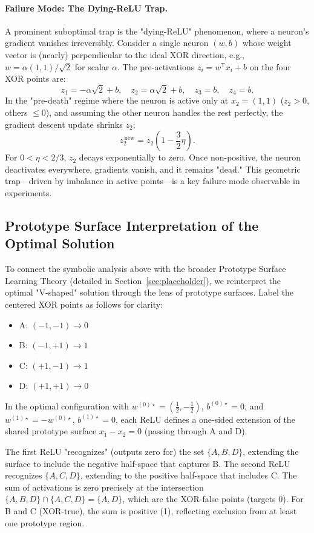 \paragraph{Failure Mode: The Dying-ReLU Trap.}
A prominent suboptimal trap is the "dying-ReLU" phenomenon, where a neuron's gradient vanishes irreversibly. Consider a single neuron \((w,b)\) whose weight vector is (nearly) perpendicular to the ideal XOR direction, e.g., \(w = \alpha (1, 1)/\sqrt{2}\) for scalar \(\alpha\). The pre-activations \(z_i = w^{\mathsf T}x_i + b\) on the four XOR points are:
\[
    z_1 = -\alpha\sqrt{2}+b, \quad z_2=\alpha\sqrt{2}+b, \quad z_3=b, \quad z_4=b.
\]
In the "pre-death" regime where the neuron is active only at \(x_2=(1,1)\) (\(z_2 > 0\), others \(\leq 0\)), and assuming the other neuron handles the rest perfectly, the gradient descent update shrinks \(z_2\):
\[
    z_2^{\,\text{new}} = z_2 \left(1-\frac{3}{2}\eta\right).
\]
For \(0 < \eta < 2/3\), \(z_2\) decays exponentially to zero. Once non-positive, the neuron deactivates everywhere, gradients vanish, and it remains "dead." This geometric trap—driven by imbalance in active points—is a key failure mode observable in experiments.

\subsection*{Prototype Surface Interpretation of the Optimal Solution}

To connect the symbolic analysis above with the broader Prototype Surface Learning Theory (detailed in Section~\ref{sec:placeholder}), we reinterpret the optimal "V-shaped" solution through the lens of prototype surfaces. Label the centered XOR points as follows for clarity:

\begin{itemize}
    \item A: $(-1, -1) \to 0$
    \item B: $(-1, +1) \to 1$
    \item C: $(+1, -1) \to 1$
    \item D: $(+1, +1) \to 0$
\end{itemize}

In the optimal configuration with $w^{(0)\star} = (\frac{1}{2}, -\frac{1}{2})$, $b^{(0)\star}=0$, and $w^{(1)\star} = -w^{(0)\star}$, $b^{(1)\star}=0$, each ReLU defines a one-sided extension of the shared prototype surface $x_1 - x_2 = 0$ (passing through A and D).

The first ReLU "recognizes" (outputs zero for) the set $\{A, B, D\}$, extending the surface to include the negative half-space that captures B. The second ReLU recognizes $\{A, C, D\}$, extending to the positive half-space that includes C. The sum of activations is zero precisely at the intersection $\{A, B, D\} \cap \{A, C, D\} = \{A, D\}$, which are the XOR-false points (targets 0). For B and C (XOR-true), the sum is positive (1), reflecting exclusion from at least one prototype region.

